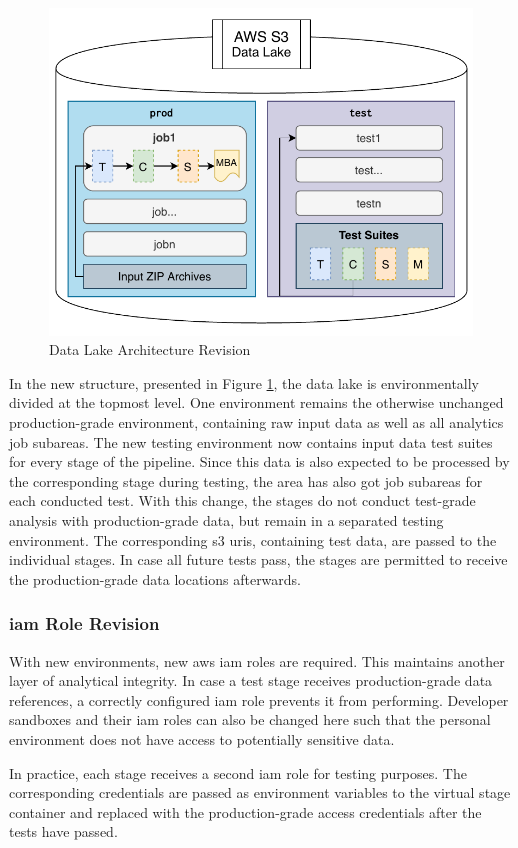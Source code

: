 \begin{figure}[h!]
	\centering
	\includegraphics[width=0.67\linewidth]{main-matter/img/5-data-lake-new}
	\caption{Data Lake Architecture Revision}
	\label{fig:5-new-data-lake}
\end{figure}

In the new structure, presented in Figure \ref{fig:5-new-data-lake}, the data lake is environmentally divided at the topmost level. One environment remains the otherwise unchanged production-grade environment, containing raw input data as well as all analytics job subareas. The new testing environment now contains input data test suites for every stage of the pipeline. Since this data is also expected to be processed by the corresponding stage during testing, the area has also got job subareas for each conducted test.
\newpage
With this change, the stages do not conduct test-grade analysis with production-grade data, but remain in a separated testing environment. The corresponding \ac{s3} \acp{uri}, containing test data, are passed to the individual stages. In case all future tests pass, the stages are permitted to receive the production-grade data locations afterwards.

\subsubsection{\acs{iam} Role Revision}
With new environments, new \ac{aws} \ac{iam} roles are required. This maintains another layer of analytical integrity. In case a test stage receives production-grade data references, a correctly configured \ac{iam} role prevents it from performing. Developer sandboxes and their \ac{iam} roles can also be changed here such that the personal environment does not have access to potentially sensitive data.

In practice, each stage receives a second \ac{iam} role for testing purposes. The corresponding credentials are passed as environment variables to the virtual stage container and replaced with the production-grade access credentials after the tests have passed. \\\


